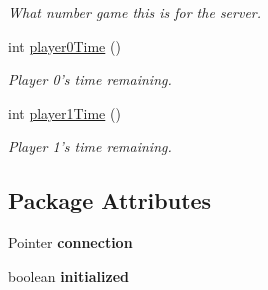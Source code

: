 \begin{DoxyCompactItemize}
\begin{DoxyCompactList}\small\item\em What number game this is for the server. \item\end{DoxyCompactList}\item 
\hypertarget{classBaseAI_a0c98c065f57b1519d6daf72ef1c71d71}{
int \hyperlink{classBaseAI_a0c98c065f57b1519d6daf72ef1c71d71}{player0Time} ()}
\label{classBaseAI_a0c98c065f57b1519d6daf72ef1c71d71}

\begin{DoxyCompactList}\small\item\em Player 0's time remaining. \item\end{DoxyCompactList}\item 
\hypertarget{classBaseAI_a5a96b2451bf0e2f6567e9e56d59cf7cb}{
int \hyperlink{classBaseAI_a5a96b2451bf0e2f6567e9e56d59cf7cb}{player1Time} ()}
\label{classBaseAI_a5a96b2451bf0e2f6567e9e56d59cf7cb}

\begin{DoxyCompactList}\small\item\em Player 1's time remaining. \item\end{DoxyCompactList}\end{DoxyCompactItemize}
\subsection*{Package Attributes}
\begin{DoxyCompactItemize}
\item 
\hypertarget{classBaseAI_ad9836b270a011daee8411f84590ba35a}{
Pointer {\bfseries connection}}
\label{classBaseAI_ad9836b270a011daee8411f84590ba35a}

\item 
\hypertarget{classBaseAI_a94966bbfdac0d091a7332f19b29935c3}{
boolean {\bfseries initialized}}
\label{classBaseAI_a94966bbfdac0d091a7332f19b29935c3}

\end{DoxyCompactItemize}
